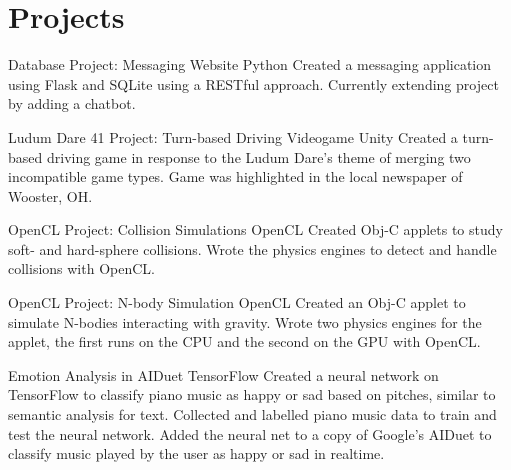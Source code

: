 \documentclass[]{friggeri-cv}
\begin{document}
\section{Projects}
\begin{entrylist}
 {Database Project: Messaging Website}
 {Python}
 {Created a messaging application using Flask and SQLite using a RESTful approach. Currently extending project by adding a chatbot. \\}

 {Ludum Dare 41 Project: Turn-based Driving Videogame}
 {Unity}
 {Created a turn-based driving game in response to the Ludum Dare's theme of merging two incompatible game types. Game was highlighted in the local newspaper of Wooster, OH. \\}

 {OpenCL Project: Collision Simulations}
 {OpenCL}
 {Created Obj-C applets to study soft- and hard-sphere collisions. Wrote the physics engines to detect and handle collisions with OpenCL. \\}

 {OpenCL Project: N-body Simulation}
 {OpenCL}
 {Created an Obj-C applet to simulate N-bodies interacting with gravity. Wrote two physics engines for the applet, the first runs on the CPU and the second on the GPU with OpenCL.\\}

 {Emotion Analysis in AIDuet}
 {TensorFlow}
 {Created a neural network on TensorFlow to classify piano music as happy or sad based on pitches, similar to semantic analysis for text. Collected and labelled piano music data to train and test the neural network. Added the neural net to a copy of Google's AIDuet to classify music played by the user as happy or sad in realtime.\\}
  \end{entrylist}
\end{document}
